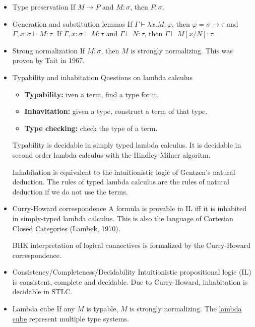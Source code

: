 \documentclass[11pt]{article}
\begin{document}
\begin{itemize}
\item Type preservation
\label{sec-9-1-3-4}
If $M \longrightarrow P$ and $M:\sigma$, then $P:\sigma$.

\item Generation and substitution lemmas
\label{sec-9-1-3-5}
If $\Gamma \vdash \lambda x. M: \varphi$, then $\varphi = \sigma \to \tau$ and $\Gamma, x:\sigma \vdash M : \tau$.
If $\Gamma, x:\sigma \vdash M : \tau$ and $\Gamma \vdash N:\tau$, then $\Gamma \vdash M[x/N]:\tau$.

\item Strong normalization
\label{sec-9-1-3-6}
If $M : \sigma$, then $M$ is strongly normalizing. This was proven by
Tait in 1967.
\item Typability and inhabitation
\label{sec-9-1-3-7}
Questions on lambda calculus

\begin{itemize}
\item \textbf{Typability:} iven a term, find a type for it.
\item \textbf{Inhavitation:} given a type, construct a term of that type.
\item \textbf{Type checking:} check the type of a term.
\end{itemize}

Typability is decidable in simply typed lambda calculus. It is
decidable in second order lambda calculus with the Hindley-Milner
algoritm.

Inhabitation is equivalent to the intuitionistic logic of Gentzen's
natural deduction. The rules of typed lambda calculus are the rules
of natural deduction if we do not use the terms.

\item Curry-Howard correspondence
\label{sec-9-1-3-8}
A formula is provable in IL iff it is inhabited in simply-typed lambda
calculus. This is also the language of Cartesian Closed Categories
(Lambek, 1970).

BHK interpretation of logical connectives is formalized by the 
Curry-Howard correspondence.

\item Consistency/Completeness/Decidability
\label{sec-9-1-3-9}
Intuitionistic propositional logic (IL) is consistent, complete and
decidable. Due to Curry-Howard, inhabitation is decidable in STLC.
\item Lambda cube
\label{sec-9-1-3-10}
If any $M$ is typable, $M$ is strongly normalizing.
The \href{https://en.wikipedia.org/wiki/Lambda_cube}{lambda cube} represent multiple type systems.


\end{itemize}
\end{document}
